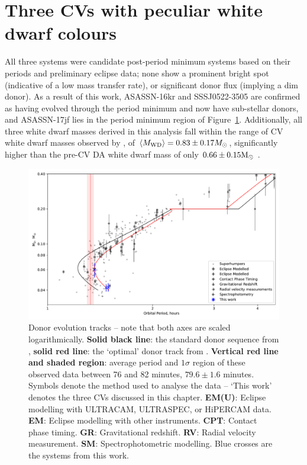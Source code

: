 \label{chpt:discussion} %



\section{Three CVs with peculiar white dwarf colours}
\label{sect:discussion:three CVs with peculiar white dwarf colours}

All three systems were candidate post-period minimum systems based on their periods and preliminary eclipse data; none show a prominent bright spot (indicative of a low mass transfer rate), or significant donor flux (implying a dim donor).
As a result of this work, ASASSN-16kr and SSSJ0522-3505 are confirmed as having evolved through the period minimum and now have sub-stellar donors, and ASASSN-17jf lies in the period minimum region of Figure~\ref{fig:M2_vs_P}.
Additionally, all three white dwarf masses derived in this analysis fall within the range of CV white dwarf masses observed by \citet{pala2020}, of $\langle M_{\rm WD}\rangle = 0.83 \pm 0.17 M_\odot$, significantly higher than the pre-CV DA white dwarf mass of only $0.66 \pm 0.15 {\rm M_\odot}$ \citep{mccleery2020}.


\begin{figure}
    \centering
    \includegraphics[width=\textwidth]{figures/results/three_cvs_with_weird_colours/GeneralFigs/M2_vs_P_withhumpers.pdf}
    \caption{Donor evolution tracks -- note that both axes are scaled logarithmically. {\bf Solid black line}: the standard donor sequence from \citet{knigge11}, {\bf solid red line}: the `optimal' donor track from \citet{knigge11}. {\bf Vertical red line and shaded region}: average period and $1\sigma$ region of these observed data between 76 and 82 minutes, $79.6\pm1.6$ minutes. Symbols denote the method used to analyse the data -- `This work' denotes the three CVs discussed in this chapter. \textbf{EM(U)}: Eclipse modelling with ULTRACAM, ULTRASPEC, or HiPERCAM data. \textbf{EM}: Eclipse modelling with other instruments. \textbf{CPT}: Contact phase timing. \textbf{GR}: Gravitational redshift. \textbf{RV}: Radial velocity measurement. \textbf{SM}: Spectrophotometric modelling. Blue crosses are the systems from this work.}
    \label{fig:M2_vs_P}
\end{figure}

